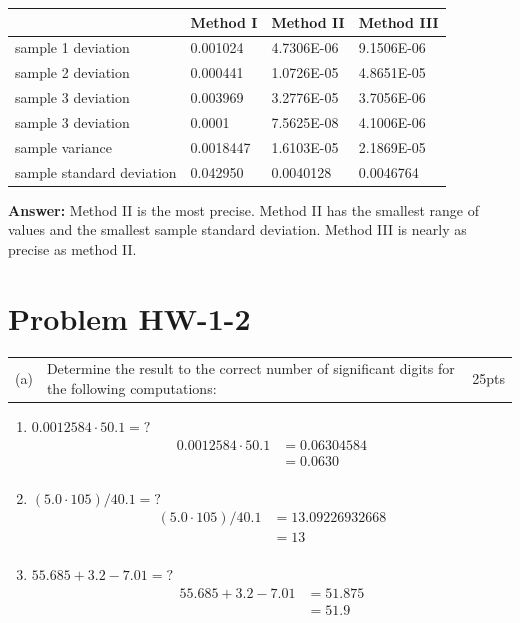 \documentclass{article}
\newcommand{\problemstatement}[3]{
\noindent
\begin{tabular}{ m{0.5cm} m{42em} m{0.5cm} }
	({#1}) & {#2} & {#3}pts
\end{tabular}
}
\begin{document}
\begin{addmargin}[1.5cm]{0em}
	\begin{center}
		\begin{tabular}{| w{c}{4cm} | w{c}{2cm} | w{c}{2cm} | w{c}{2cm} |}
			\hline
			& Method I & Method II & Method III \\ \hline
			sample 1 deviation & 0.001024  & 4.7306E-06 & 9.1506E-06 \\ \hline
			sample 2 deviation & 0.000441  & 1.0726E-05 & 4.8651E-05 \\ \hline
			sample 3 deviation & 0.003969  & 3.2776E-05 & 3.7056E-06 \\ \hline
			sample 3 deviation & 0.0001    & 7.5625E-08 & 4.1006E-06 \\ \hline
			sample variance    & 0.0018447 & 1.6103E-05 & 2.1869E-05 \\ \hline
			sample standard deviation & 0.042950 & 0.0040128 & 0.0046764 \\ \hline
		\end{tabular}
	\end{center}
	\noindent
	\textbf{Answer:} Method II is the most precise. Method II has the smallest range of values and the smallest sample standard deviation. Method III is nearly as precise as method II.
\end{addmargin}

\newpage
\section{Problem HW-1-2}
\problemstatement{a}{Determine the result to the correct number of significant digits for the following computations:}{25}
\begin{enumerate}
	\item $ 0.0012584 \cdot 50.1 = ? $
	\begin{align*}
		0.0012584 \cdot 50.1 &= 0.06304584 \\
		      &= 0.0630 \\
	\end{align*}
	\item $ (5.0 \cdot 105) /  40.1 = ? $
	\begin{align*}
		(5.0 \cdot 105) /  40.1 &= 13.09226932668 \\
		      &= 13 \\
	\end{align*}
	\item $ 55.685 + 3.2 - 7.01 = ?  $
	\begin{align*}
		55.685 + 3.2 - 7.01 &= 51.875 \\
		      &= 51.9 \\
	\end{align*}
\end{enumerate}
\end{document}
